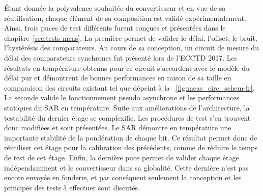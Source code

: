 \begin{mdframed}[linecolor=Prune,linewidth=1]
Étant donnée la polyvalence souhaitée du convertisseur et en vue de sa réutilisation, chaque élément de sa composition est validé expérimentalement. Ainsi, trois puces de test différents furent conçues et présentées dans le chapitre~\ref{sec:tests-meas}. La première permet de valider le délai, l'offset, le bruit, l’hystérésis des comparateurs. Au cours de sa conception, un circuit de mesure du délai des comparateurs synchrones fut présenté lors de l'ECCTD 2017. Les résultats en température obtenus pour ce circuit s'accordent avec le modèle du délai pur et démontrent de bonnes performances en raison de sa taille en comparaison des circuits existant tel que dépeint à la \figurename~\ref{fig:meas_circ_schem-fr}. La seconde valide le fonctionnement pseudo asynchrone et les performances statiques du SAR en température. Suite aux améliorations de l'architecture, la testabilité du dernier étage se complexifie. Les procédures de test s'en trouvent donc modifiées et sont présentées. Le SAR démontre en température une importante stabilité de la pondération de chaque bit. Ce résultat permet donc de réutiliser cet étage pour la calibration des précédents, comme de réduire le temps de test de cet étage. Enfin, la dernière puce permet de valider chaque étage indépendamment et le convertisseur dans sa globalité. Cette dernière n'est pas encore envoyée en fonderie, et par conséquent seulement la conception et les principes des tests à effectuer sont discutés.


\end{mdframed}
